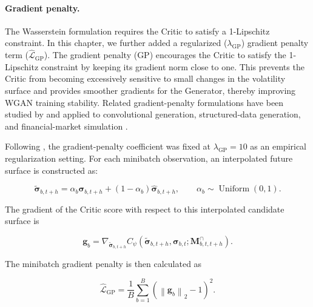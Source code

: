 \paragraph*{Gradient penalty.}
The Wasserstein formulation requires the Critic to satisfy a 1-Lipschitz
constraint. In this chapter, we further added a regularized ($\lambda_{\mathrm{GP}}$) gradient penalty term ($\widehat{\mathcal{L}}_{\mathrm{GP}}$). The gradient penalty (GP) encourages the Critic to satisfy the 1-Lipschitz constraint by keeping its gradient norm close to one. This prevents the Critic from becoming excessively sensitive to small changes in the volatility surface and provides smoother gradients for the Generator, thereby improving WGAN training stability. Related gradient-penalty formulations have been studied by \cite{petzka2018regularization,mescheder2018training} and applied to convolutional generation, structured-data generation, and financial-market simulation \cite{karras2018progressive,xu2019modeling,han2022simulating}.

Following \citet{gulrajani2017improved}, the gradient-penalty coefficient was fixed at \(\lambda_{\mathrm{GP}}=10\) as an empirical regularization setting. For each minibatch observation, an interpolated future surface is constructed as:


\begin{equation}\label{eq:ch3:critic_interpolation}
\widetilde{\boldsymbol{\sigma}}_{b,t+h}
=
\alpha_b
\boldsymbol{\sigma}_{b,t+h}
+
\left(
1-\alpha_b
\right)
\widehat{\boldsymbol{\sigma}}_{b,t+h},
\qquad
\alpha_b
\sim
\operatorname{Uniform}(0,1).
\end{equation}

The gradient of the Critic score with respect to this interpolated candidate
surface is

\begin{equation}\label{eq:ch3:critic_input_gradient}
\mathbf{g}_b
=
\nabla_{\widetilde{\boldsymbol{\sigma}}_{b,t+h}}
C_{\psi}
\left(
\widetilde{\boldsymbol{\sigma}}_{b,t+h},
\boldsymbol{\sigma}_{b,t};
\mathbf{M}^{\cap}_{b,t,t+h}
\right).
\end{equation}

The minibatch gradient penalty is then calculated as

\begin{equation}\label{eq:ch3:gradient_penalty}
\widehat{\mathcal{L}}_{\mathrm{GP}}
=
\frac{1}{B}
\sum_{b=1}^{B}
\left(
\left\|
\mathbf{g}_b
\right\|_2
-
1
\right)^2.
\end{equation}

